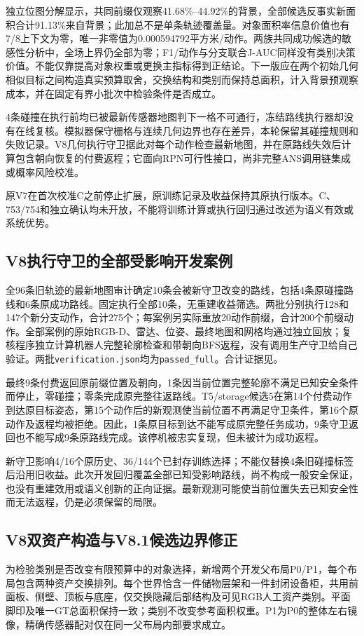 \documentclass[11pt,a4paper]{article}
\begin{document}
独立位图分解显示，共同前缀仅观察41.68\%--44.92\%的背景，全部候选反事实新面积合计91.13\%来自背景；此加总不是单条轨迹覆盖量。对象面积率信息价值也有7/8上下文为零，唯一非零值为0.000594792平方米/动作。两族共同成功候选的敏感性分析中，全场上界仍全部为零；F1/动作与分支联合J-AUC同样没有类别决策价值。不能仅靠提高对象权重或更换主指标得到正结论。下一版应在两个初始几何相似目标之间构造真实预算取舍，交换结构和类别而保持总面积，计入背景预观察成本，并在固定有界小批次中检验条件是否成立。

4条碰撞在执行前均已被最新传感器地图判下一格不可通行，冻结路线执行器却没有在线复核。模拟器保守栅格与连续几何边界也存在差异，本轮保留其碰撞规则和失败记录。V8几何执行守卫据此对每个动作检查最新地图，并在原路线失效后计算包含朝向恢复的付费返程；它面向RPN可行性接口，尚非完整ANS调用链集成或概率风险校准。

原V7在首次校准C之前停止扩展，原训练记录及收益保持其原执行版本。C、753/754和独立确认均未开放，不能将训练计算或执行回归通过改述为语义有效或系统优势。

\subsection{V8执行守卫的全部受影响开发案例}
全96条旧轨迹的最新地图审计确定10条会被新守卫改变的路线，包括4条原碰撞路线和6条原成功路线。固定执行全部10条，无重建收益筛选。两批分别执行128和147个新分支动作，合计275个；每案例另实际重放20动作前缀，合计200个前缀动作。全部案例的原始RGB-D、雷达、位姿、最终地图和网格均通过独立回放；复核程序独立计算机器人完整轮廓检查和带朝向BFS返程，没有调用生产守卫给自己验证。两批\texttt{verification.json}均为\texttt{passed\_full}。合计证据见。

最终9条付费返回原前缀位置及朝向，1条因当前位置完整轮廓不满足已知安全条件而停止，零碰撞；零条完成原完整往返路线。T5/storage候选5在第14个付费动作到达原目标姿态，第15个动作后的新观测使当前位置不再满足守卫条件，第16个原动作及返程均被拒绝。因此，1条原目标到达不能写成原完整任务成功，9条守卫返回也不能写成9条原路线完成。该停机被忠实复现，但未被计为成功返程。

新守卫影响4/16个原历史、36/144个已封存训练选择；不能仅替换4条旧碰撞标签后沿用旧收益。此次开发回归覆盖全部已知受影响路线，尚不构成一般安全保证，也没有重建效用或语义创新的正向证据。最新观测可能使当前位置失去已知安全性而无法返程，仍是必须保留的局限。

\subsection{V8双资产构造与V8.1候选边界修正}
为检验类别是否改变有限预算中的对象选择，新增两个开发父布局P0/P1，每个布局包含两种资产交换排列。每个世界恰含一件储物层架和一件封闭设备柜，共用前面板、侧壁、顶板与底座，仅交换隐藏后部结构及可见RGB人工资产类别。平面脚印及唯一GT总面积保持一致；类别不改变参考面积权重。P1为P0的整体左右镜像，精确传感器配对仅在同一父布局内部要求成立。
\end{document}
